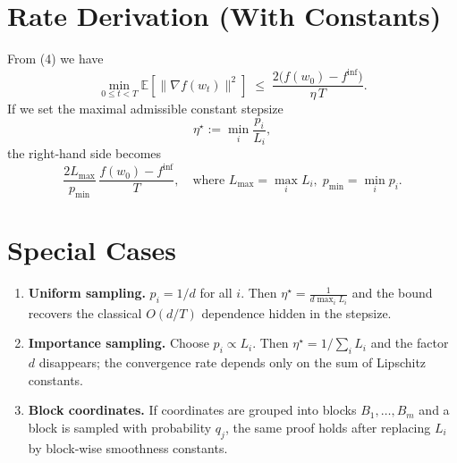 \documentclass{article}
\newcommand{\EE}{\mathbb{E}}
\begin{document}
\section*{Rate Derivation (With Constants)}
From (4) we have
\[
\min_{0\le t<T}\EE[\|\nabla f(w_t)\|^{2}]
\;\le\;
\frac{2\bigl(f(w_0)-f^{\inf}\bigr)}{\eta\,T}.
\]
If we set the maximal admissible constant stepsize
\[
\eta^{\star}:=\min_{i}\frac{p_i}{L_i},
\tag{7}
\]
the right‑hand side becomes
\[
\frac{2L_{\max}}{p_{\min}}\,
\frac{f(w_0)-f^{\inf}}{T},
\quad\text{where }L_{\max}=\max_i L_i,\;p_{\min}=\min_i p_i .
\]

\section*{Special Cases}
\begin{enumerate}[label=\textbf{S\arabic*.},leftmargin=*,nosep]
\item \textbf{Uniform sampling.} $p_i=1/d$ for all $i$.  
Then $\eta^{\star}= \frac{1}{d\max_i L_i}$ and the bound recovers the classical $O(d/T)$ dependence hidden in the stepsize.
\item \textbf{Importance sampling.} Choose $p_i\propto L_i$.  
Then $\eta^{\star}=1/\sum_{i}L_i$ and the factor $d$ disappears; the convergence rate depends only on the sum of Lipschitz constants.
\item \textbf{Block coordinates.} If coordinates are grouped into blocks $B_1,\dots,B_m$ and a block is sampled with probability $q_j$, the same proof holds after replacing $L_i$ by block‑wise smoothness constants.
\end{enumerate}
\end{document}
